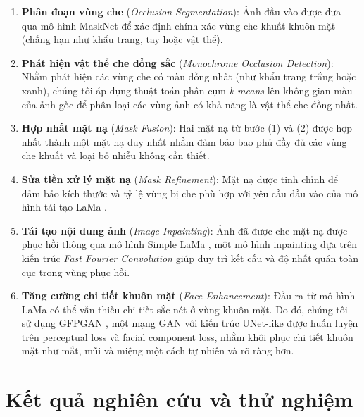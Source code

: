 \documentclass[12pt,a4paper]{article}
\begin{document}
	\begin{enumerate}
		\item \textbf{Phân đoạn vùng che} (\textit{Occlusion Segmentation}): Ảnh đầu vào được đưa qua mô hình MaskNet \cite{masknet} để xác định chính xác vùng che khuất khuôn mặt (chẳng hạn như khẩu trang, tay hoặc vật thể).
		
		\item \textbf{Phát hiện vật thể che đồng sắc} (\textit{Monochrome Occlusion Detection}): Nhằm phát hiện các vùng che có màu đồng nhất (như khẩu trang trắng hoặc xanh), chúng tôi áp dụng thuật toán phân cụm \textit{k-means} lên không gian màu của ảnh gốc để phân loại các vùng ảnh có khả năng là vật thể che đồng nhất.
		
		\item \textbf{Hợp nhất mặt nạ} (\textit{Mask Fusion}): Hai mặt nạ từ bước (1) và (2) được hợp nhất thành một mặt nạ duy nhất nhằm đảm bảo bao phủ đầy đủ các vùng che khuất và loại bỏ nhiễu không cần thiết.
		
		\item \textbf{Sửa tiền xử lý mặt nạ} (\textit{Mask Refinement}): Mặt nạ được tinh chỉnh để đảm bảo kích thước và tỷ lệ vùng bị che phù hợp với yêu cầu đầu vào của mô hình tái tạo LaMa \cite{lama}.
		
		\item \textbf{Tái tạo nội dung ảnh} (\textit{Image Inpainting}): Ảnh đã được che mặt nạ được phục hồi thông qua mô hình Simple LaMa \cite{lama}, một mô hình inpainting dựa trên kiến trúc \textit{Fast Fourier Convolution} giúp duy trì kết cấu và độ nhất quán toàn cục trong vùng phục hồi.
		
		\item \textbf{Tăng cường chi tiết khuôn mặt} (\textit{Face Enhancement}): Đầu ra từ mô hình LaMa có thể vẫn thiếu chi tiết sắc nét ở vùng khuôn mặt. Do đó, chúng tôi sử dụng GFPGAN \cite{gfpgan}, một mạng GAN với kiến trúc UNet-like được huấn luyện trên perceptual loss và facial component loss, nhằm khôi phục chi tiết khuôn mặt như mắt, mũi và miệng một cách tự nhiên và rõ ràng hơn.
	\end{enumerate}
	
	\section{Kết quả nghiên cứu và thử nghiệm}
	
\end{document}
